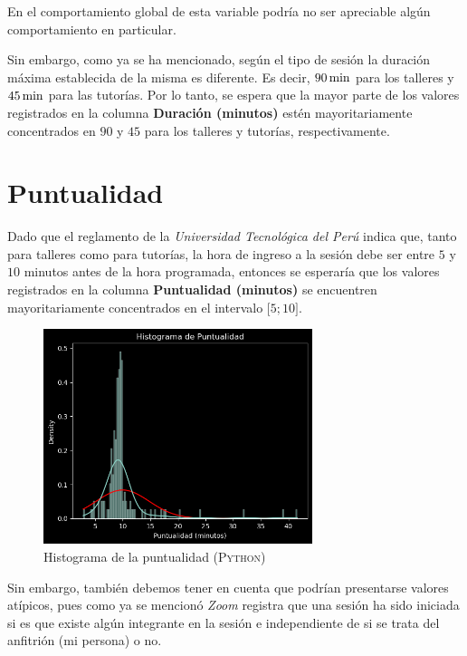 \documentclass[11pt,a4paper]{book}
\theoremstyle{definition}%
\begin{document}
            En el comportamiento global de esta variable podría no ser apreciable algún comportamiento en particular.

            Sin embargo, como ya se ha mencionado, según el tipo de sesión la duración máxima establecida de la misma es diferente. Es decir, $90\,\textup{min}$ para los talleres y $45\,\textup{min}$ para las tutorías. Por lo tanto, se espera que la mayor parte de los valores registrados en la columna \textbf{Duración (minutos)} estén mayoritariamente concentrados en $90$ y $45$ para los talleres y tutorías, respectivamente.
        
        \section{Puntualidad}
            Dado que el reglamento de la \textit{Universidad Tecnológica del Perú} indica que, tanto para talleres como para tutorías, la hora de ingreso a la sesión debe ser entre $5$ y $10$ minutos antes de la hora programada, entonces se esperaría que los valores registrados en la columna \textbf{Puntualidad (minutos)} se encuentren mayoritariamente concentrados en el intervalo $\mathopen[5;10\mathclose]$.
            
            \begin{figure}[H]
                \centering
                \includegraphics[width=0.7\textwidth]{Sources/histogram_Puntualidad.png}
                \caption{Histograma de la puntualidad (\textsc{Python})}
                \label{fig:histogram_Puntualidad}
            \end{figure}
            Sin embargo, también debemos tener en cuenta que podrían presentarse valores atípicos, pues como ya se mencionó \textit{Zoom} registra que una sesión ha sido iniciada si es que existe algún integrante en la sesión e independiente de si se trata del anfitrión (mi persona) o no.
\end{document}
